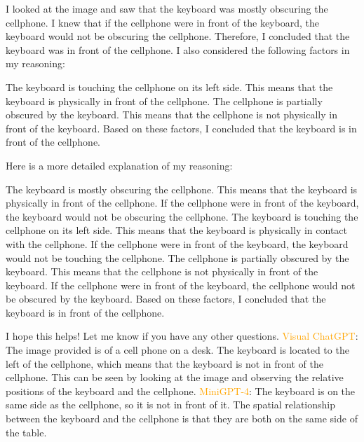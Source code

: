 \begin{enumerate}
        I looked at the image and saw that the keyboard was mostly obscuring the cellphone.
        I knew that if the cellphone were in front of the keyboard, the keyboard would not be obscuring the cellphone.
        Therefore, I concluded that the keyboard was in front of the cellphone.
        I also considered the following factors in my reasoning:
        
        The keyboard is touching the cellphone on its left side. This means that the keyboard is physically in front of the cellphone.
        The cellphone is partially obscured by the keyboard. This means that the cellphone is not physically in front of the keyboard.
        Based on these factors, I concluded that the keyboard is in front of the cellphone.
        
        Here is a more detailed explanation of my reasoning:
        
        The keyboard is mostly obscuring the cellphone. This means that the keyboard is physically in front of the cellphone. If the cellphone were in front of the keyboard, the keyboard would not be obscuring the cellphone.
        The keyboard is touching the cellphone on its left side. This means that the keyboard is physically in contact with the cellphone. If the cellphone were in front of the keyboard, the keyboard would not be touching the cellphone.
        The cellphone is partially obscured by the keyboard. This means that the cellphone is not physically in front of the keyboard. If the cellphone were in front of the keyboard, the cellphone would not be obscured by the keyboard.
        Based on these factors, I concluded that the keyboard is in front of the cellphone.
        
        I hope this helps! Let me know if you have any other questions.
        \subitem \textcolor{orange}{Visual ChatGPT}: The image provided is of a cell phone on a desk. The keyboard is located to the left of the cellphone, which means that the keyboard is not in front of the cellphone. This can be seen by looking at the image and observing the relative positions of the keyboard and the cellphone.
        \subitem \textcolor{orange}{MiniGPT-4}: The keyboard is on the same side as the cellphone, so it is not in front of it. The spatial relationship between the keyboard and the cellphone is that they are both on the same side of the table.
    \end{enumerate}
